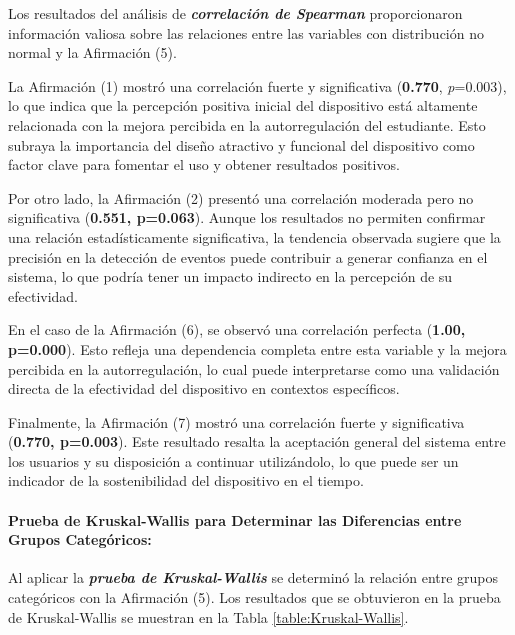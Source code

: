 \documentclass[a4paper,fleqn]{cas-sc}
\begin{document}
					Los resultados del análisis de \textit{\textbf{correlación de Spearman}} proporcionaron información valiosa sobre las relaciones entre las variables con distribución no normal y la Afirmación (5).
					
					La Afirmación (1) mostró una correlación fuerte y significativa (\textbf{0.770}, \textit{p}=0.003), lo que indica que la percepción positiva inicial del dispositivo está altamente relacionada con la mejora percibida en la autorregulación del estudiante. Esto subraya la importancia del diseño atractivo y funcional del dispositivo como factor clave para fomentar el uso y obtener resultados positivos.
					
					Por otro lado, la Afirmación (2) presentó una correlación moderada pero no significativa (\textbf{0.551, p=0.063}). Aunque los resultados no permiten confirmar una relación estadísticamente significativa, la tendencia observada sugiere que la precisión en la detección de eventos puede contribuir a generar confianza en el sistema, lo que podría tener un impacto indirecto en la percepción de su efectividad.
					
					En el caso de la Afirmación (6), se observó una correlación perfecta (\textbf{1.00, p=0.000}). Esto refleja una dependencia completa entre esta variable y la mejora percibida en la autorregulación, lo cual puede interpretarse como una validación directa de la efectividad del dispositivo en contextos específicos.
					
					Finalmente, la Afirmación (7) mostró una correlación fuerte y significativa (\textbf{0.770, p=0.003}). Este resultado resalta la aceptación general del sistema entre los usuarios y su disposición a continuar utilizándolo, lo que puede ser un indicador de la sostenibilidad del dispositivo en el tiempo.
					
					\paragraph*{Prueba de Kruskal-Wallis para Determinar las Diferencias entre Grupos Categóricos: }
					Al aplicar la \textbf{\textit{prueba de Kruskal-Wallis}} se determinó la relación entre grupos categóricos con la Afirmación (5). Los resultados que se obtuvieron en la prueba de Kruskal-Wallis se muestran en la Tabla \ref{table:Kruskal-Wallis}.
					
\end{document}
